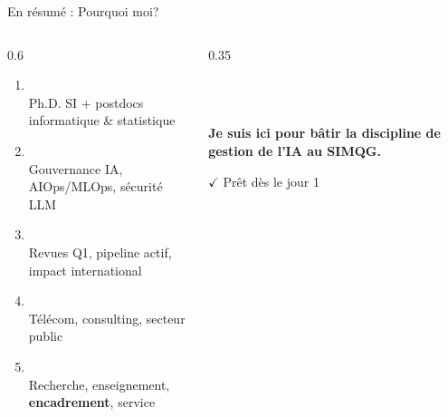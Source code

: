 \documentclass[aspectratio=169,11pt]{beamer}
\begin{document}
\begin{frame}{En résumé : Pourquoi moi?}
  \begin{columns}[T]
    \begin{column}{0.6\textwidth}
      \begin{enumerate}
        \item[1.]  \\
        {\small Ph.D. SI + postdocs informatique \& statistique}
        \vspace{0.25em}
        \item[2.]  \\
        {\small Gouvernance IA, AIOps/MLOps, sécurité LLM}
        \vspace{0.25em}
        \item[3.]  \\
        {\small Revues Q1, pipeline actif, impact international}
        \vspace{0.25em}
        \item[4.]  \\
        {\small Télécom, consulting, secteur public}
        \vspace{0.25em}
        \item[5.]  \\
        {\small Recherche, enseignement, \textbf{encadrement}, service}
      \end{enumerate}
    \end{column}
    \begin{column}{0.35\textwidth}
      \centering
      \colorbox{ushervert}{\parbox{3cm}{\centering\textcolor{white}{\large\bfseries Le bon profil\\pour le SIMQG}}}
      
      \vspace{0.6em}
      
      {\small\textbf{Je suis ici pour bâtir la discipline de gestion de l'IA au SIMQG.}}
      
      \vspace{0.5em}
      
      $\checkmark$ \small Prêt dès le jour 1
    \end{column}
  \end{columns}
\end{frame}
\end{document}
